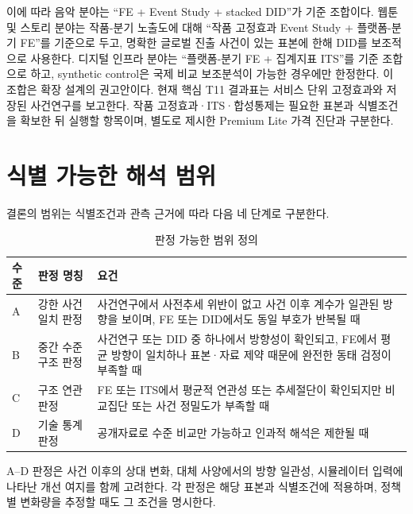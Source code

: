 \documentclass[11pt,a4paper]{report}
\begin{document}
이에 따라 음악 분야는 ``FE + Event Study + stacked DID''가 기준 조합이다. 웹툰 및 스토리 분야는 작품-분기 노출도에 대해 ``작품 고정효과 Event Study + 플랫폼-분기 FE''를 기준으로 두고, 명확한 글로벌 진출 사건이 있는 표본에 한해 DID를 보조적으로 사용한다. 디지털 인프라 분야는 ``플랫폼-분기 FE + 집계지표 ITS''를 기준 조합으로 하고, synthetic control은 국제 비교 보조분석이 가능한 경우에만 한정한다. 이 조합은 확장 설계의 권고안이다. 현재 핵심 T11 결과표는 서비스 단위 고정효과와 저장된 사건연구를 보고한다. 작품 고정효과·ITS·합성통제는 필요한 표본과 식별조건을 확보한 뒤 실행할 항목이며, 별도로 제시한 Premium Lite 가격 진단과 구분한다.

\section{식별 가능한 해석 범위}
결론의 범위는 식별조건과 관측 근거에 따라 다음 네 단계로 구분한다.
\begin{table}[H]
  \centering
  \small
  \caption{판정 가능한 범위 정의}\label{tab:decision_scope_levels}
  \begin{tabular}{p{1.8cm}p{3.4cm}p{7.7cm}}
    \toprule
    \rowcolor{ReportTableHead}
    수준 & 판정 명칭 & 요건 \\
    \midrule
    A & 강한 사건 일치 판정 & 사건연구에서 사전추세 위반이 없고 사건 이후 계수가 일관된 방향을 보이며, FE 또는 DID에서도 동일 부호가 반복될 때 \\
    B & 중간 수준 구조 판정 & 사건연구 또는 DID 중 하나에서 방향성이 확인되고, FE에서 평균 방향이 일치하나 표본·자료 제약 때문에 완전한 동태 검정이 부족할 때 \\
    C & 구조 연관 판정 & FE 또는 ITS에서 평균적 연관성 또는 추세절단이 확인되지만 비교집단 또는 사건 정밀도가 부족할 때 \\
    D & 기술 통계 판정 & 공개자료로 수준 비교만 가능하고 인과적 해석은 제한될 때 \\
    \bottomrule
  \end{tabular}
\end{table}

A--D 판정은 사건 이후의 상대 변화, 대체 사양에서의 방향 일관성, 시뮬레이터 입력에 나타난 개선 여지를 함께 고려한다. 각 판정은 해당 표본과 식별조건에 적용하며, 정책별 변화량을 추정할 때도 그 조건을 명시한다.
\end{document}
